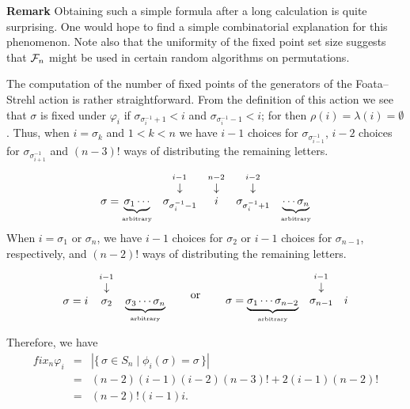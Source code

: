 {\bf\noindent Remark}
Obtaining such a simple formula after a long calculation is quite
surprising. One would hope to find a simple combinatorial explanation for this
phenomenon. Note also that the uniformity of the fixed point set
size suggests that ${\cal F}_n$ might be used in certain random
algorithms on permutations. 

\bigskip 
The computation of the number of fixed points of the generators of the
Foata--Strehl action is rather straightforward. From the definition of
this action we see that $\sigma$ is fixed under $\varphi_i$ if
$\sigma_{\sigma^{-1}_{i}+1} < i$ and $\sigma_{\sigma^{-1}_{i}-1} < i$;
for then $\rho(i) = \lambda(i)=\emptyset$. 
Thus, when $i=\sigma_k$ and $1 < k <n$ we have $i-1$ choices for $\sigma_{\sigma^{-1}_{i-1}}$, $i-2$ choices for $\sigma_{\sigma_{i+1}^{-1}}$ and
$(n-3)!$ ways of distributing the remaining letters.
 $$
 \begin{array}{ccccc}
 & _{i-1} & _{n-2} & _{i-2} & \\
 & \downarrow & \downarrow & \downarrow & \\
\sigma = \underbrace{\sigma_1 \cdots}_{\mbox{\tiny arbitrary}} &
 \sigma_{\sigma^{-1}_{i}-1} & i & 
\sigma_{\sigma^{-1}_{i}+1} &  \underbrace{\cdots \sigma_n}_{\mbox{\tiny arbitrary}}
 \end{array}
 $$
When $i= \sigma_1$ or $\sigma_n$, we have 
$i-1$ choices for $\sigma_2$ or $i-1$ choices for $\sigma_{n-1}$, respectively, and
$(n-2)!$ ways of distributing the remaining letters.
$$
\begin{array}{ccc }
  & _{ i-1} &   \\
  & \downarrow &     \\
\sigma = i & \sigma_2 &
\underbrace{\sigma_3 \cdots \sigma_n}_{\mbox{\tiny arbitrary}} 
\end{array}
\hspace{.2 in}\mbox{ or } \hspace{.2 in}
 \begin{array}{ccc }
  & _{i-1} &   \\
  & \downarrow &     \\
\sigma = \underbrace{\sigma_1 \cdots \sigma_{n-2}}_{\mbox{\tiny arbitrary}} &
 \sigma_{n-1} & i  \end{array}
 $$

Therefore, we have
\begin{eqnarray*}
fix_{n}\varphi_i & = & | \{ \, \sigma \in S_n  \mid \phi_i(\sigma) = \sigma \,\}|\\
& = & (n-2)(i-1)(i-2)(n-3)! + 2(i-1)(n-2)! \\
& = & (n-2)!(i-1)i.
\end{eqnarray*}


